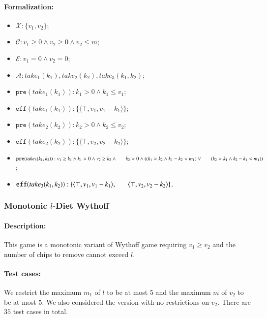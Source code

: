\documentclass[review]{elsarticle}
\newcommand{\set}[1]{\{ #1 \}}
\newcommand{\tuple}[1]{\langle {#1} \rangle}
\newcommand{\true}{\top}
\newcommand{\statevar}{\mathcal{X}}
\newcommand{\act}{\mathcal{A}}
\newcommand{\constraint}{\mathcal{C}}
\newcommand{\estate}{\mathcal{E}}
\newcommand{\pre}{\mathtt{pre}}
\newcommand{\eff}{\mathtt{eff}}
\begin{document}
\paragraph{Formalization:}
\begin{itemize}
	\item $\statevar: \set{v_1, v_2}$;
	\item $\constraint: v_1 \ge 0 \wedge v_2 \ge 0 \wedge v_2 \le m$;
	\item $\estate: v_1=0 \wedge v_2 = 0$;
	\item $\act:take_1(k_1), take_2(k_2), take_3(k_1,k_2)$;
	\item $\pre(take_1(k_1)) :  k_1 > 0 \wedge k_1 \le v_1$;
	\item $\eff(take_1(k_1)) : \set{\tuple{\true, v_1, v_1-k_1}}$;
	\item $\pre(take_2(k_2)) :  k_2 > 0 \wedge k_2 \le v_2$;
	\item $\eff(take_2(k_2)) : \set{\tuple{\true, v_2, v_2-k_2}}$;
	\item $\pre(take_3(k_1, k_2)) : v_1 \ge k_1 \wedge  k_1 > 0 \wedge v_2 \ge k_2 \wedge \\ \hspace*{6mm}
	k_2 > 0 \wedge((k_1 > k_2 \wedge k_1 - k_2 < m_1)\vee \\ \hspace*{6mm}
	(k_2 > k_1 \wedge k_2 - k_1 < m_1))$;
	\item $\eff(take_3(k_1, k_2)) : \set{\tuple{\true, v_1, v_1 -k_1},\\ \hspace*{6mm}
		\tuple{\true, v_2, v_2 - k_2}}$.
\end{itemize}



\subsubsection{Monotonic $l$-Diet Wythoff \protect\cite{AhnCCEFGGKMPS2017}} 

\paragraph{Description:}  
This game is a monotonic variant of Wythoff game requiring $v_1 \ge v_2$ and the number of chips to remove cannot exceed $l$.
\paragraph{Test cases:}
We restrict the maximum $m_1$ of $l$ to be at most $5$ and the maximum $m$ of $v_2$ to be at most $5$.
We also considered the version with no restrictions on $v_2$.
There are $35$ test cases in total.
\end{document}
